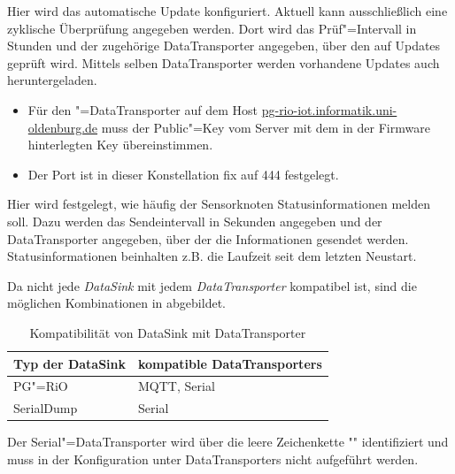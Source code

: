 Hier wird das automatische Update konfiguriert.
Aktuell kann ausschließlich eine zyklische Überprüfung angegeben werden.
Dort wird das Prüf"=Intervall in Stunden und der zugehörige DataTransporter angegeben, über den auf Updates geprüft wird. Mittels selben DataTransporter werden vorhandene Updates auch heruntergeladen.
\begin{mdframed}[frametitle=Hinweis]
	\begin{minipage}{\linewidth}
		\begin{itemize}
			\item Für den "=DataTransporter auf dem Host \url{pg-rio-iot.informatik.uni-oldenburg.de} muss der Public"=Key vom Server mit dem in der Firmware hinterlegten Key übereinstimmen.
			\item Der Port ist in dieser Konstellation fix auf 444 festgelegt.
		\end{itemize}
	\end{minipage}
\end{mdframed}

Hier wird festgelegt, wie häufig der Sensorknoten Statusinformationen melden soll.
Dazu werden das Sendeintervall in Sekunden angegeben und der DataTransporter angegeben, über der die Informationen gesendet werden.
Statusinformationen beinhalten z.B. die Laufzeit seit dem letzten Neustart.

\label{sec:userhb:compdsdt}
Da nicht jede \textit{DataSink} mit jedem \textit{DataTransporter} kompatibel ist, sind die möglichen Kombinationen in  abgebildet.

\begin{table}[htb]
	\centering
	\caption{Kompatibilität von DataSink mit DataTransporter}
	\begin{tabular}{|l|l|}
		\hline
		Typ der DataSink & kompatible DataTransporters \\ \hline
		PG"=RiO & MQTT, Serial \\ \hline
		SerialDump & Serial \\ \hline
	\end{tabular}
\label{tbl:skconfcomp}
\end{table}

\begin{mdframed}[frametitle=Hinweis]
	\begin{minipage}{\linewidth}
		Der Serial"=DataTransporter wird über die leere Zeichenkette "" identifiziert und muss in der Konfiguration unter DataTransporters nicht aufgeführt werden.
	\end{minipage}
\end{mdframed}
